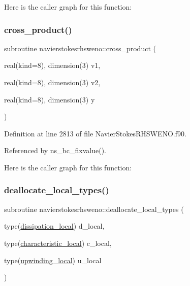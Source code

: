 Here is the caller graph for this function\+:
\hypertarget{namespacenavierstokesrhsweno_ab05f550a5f2fb0bbe1ed4e771c8e999e}{}\label{namespacenavierstokesrhsweno_ab05f550a5f2fb0bbe1ed4e771c8e999e} 
\subsubsection{\texorpdfstring{cross\+\_\+product()}{cross\_product()}}
{\footnotesize\ttfamily subroutine navierstokesrhsweno\+::cross\+\_\+product (\begin{DoxyParamCaption}\item[{real(kind=8), dimension(3)}]{v1,  }\item[{real(kind=8), dimension(3)}]{v2,  }\item[{real(kind=8), dimension(3)}]{y }\end{DoxyParamCaption})}



Definition at line 2813 of file Navier\+Stokes\+R\+H\+S\+W\+E\+N\+O.\+f90.



Referenced by ns\+\_\+bc\+\_\+fixvalue().

Here is the caller graph for this function\+:
\hypertarget{namespacenavierstokesrhsweno_a097089e1d0c132ad64a8c601319499bb}{}\label{namespacenavierstokesrhsweno_a097089e1d0c132ad64a8c601319499bb} 
\subsubsection{\texorpdfstring{deallocate\+\_\+local\+\_\+types()}{deallocate\_local\_types()}}
{\footnotesize\ttfamily subroutine navierstokesrhsweno\+::deallocate\+\_\+local\+\_\+types (\begin{DoxyParamCaption}\item[{type(\hyperlink{structnavierstokesrhsweno_1_1dissipation__local}{dissipation\+\_\+local})}]{d\+\_\+local,  }\item[{type(\hyperlink{structnavierstokesrhsweno_1_1characteristic__local}{characteristic\+\_\+local})}]{c\+\_\+local,  }\item[{type(\hyperlink{structnavierstokesrhsweno_1_1upwinding__local}{upwinding\+\_\+local})}]{u\+\_\+local }\end{DoxyParamCaption})}



